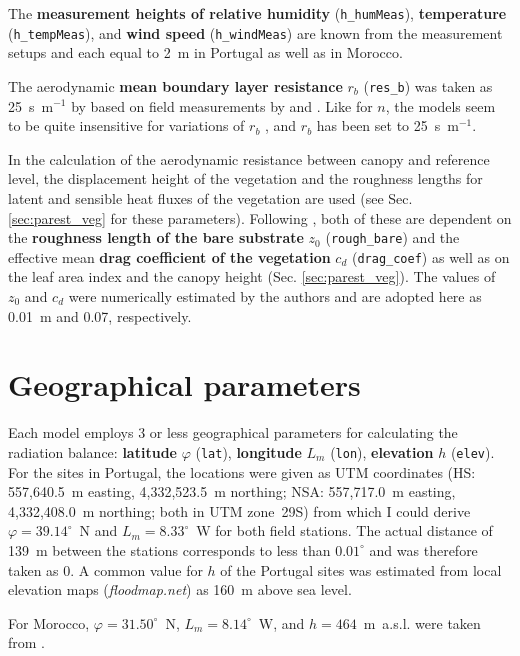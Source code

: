 \documentclass{scrreprt}
\begin{document}
The \textbf{measurement heights of relative humidity} (\verb!h_humMeas!), \textbf{temperature} (\verb!h_tempMeas!), and \textbf{wind speed} (\verb!h_windMeas!) are known from the measurement setups and each equal to 2~m in Portugal as well as in Morocco.

The aerodynamic \textbf{mean boundary layer resistance} $r_b$ (\verb!res_b!) was taken as 25~s~m$^{-1}$ by \citet{shuttleworth85} based on field measurements by \citet{denmead76} and \citet{uchijima76}.
Like for $n$, the models seem to be quite insensitive for variations of $r_b$ \citep{shuttleworth85}, and $r_b$ has been set to 25~s~m$^{-1}$.

In the calculation of the aerodynamic resistance between canopy and reference level, the displacement height of the vegetation and the roughness lengths for latent and sensible heat fluxes of the vegetation are used (see Sec. \ref{sec:parest_veg} for these parameters).
Following \citet{shuttleworth90}, both of these are dependent on the \textbf{roughness length of the bare substrate} $z_0$ (\verb!rough_bare!) and the effective mean \textbf{drag coefficient of the vegetation} $c_d$ (\verb!drag_coef!) as well as on the leaf area index and the canopy height (Sec. \ref{sec:parest_veg}).
The values of $z_0$ and $c_d$ were numerically estimated by the authors and are adopted here as 0.01~m and 0.07, respectively.

\section{Geographical parameters} \label{sec:parest_geo}

Each model employs 3 or less geographical parameters for calculating the radiation balance: \textbf{latitude} $\varphi$ (\verb!lat!), \textbf{longitude} $L_m$ (\verb!lon!), \textbf{elevation} $h$ (\verb!elev!).
For the sites in Portugal, the locations were given as UTM coordinates (HS: 557,640.5~m easting, 4,332,523.5~m northing; NSA: 557,717.0~m easting, 4,332,408.0~m northing; both in UTM zone~29S) from which I could derive $\varphi = 39.14^\circ$~N and $L_m= 8.33^\circ$~W for both field stations.
The actual distance of 139~m between the stations corresponds to less than $0.01^\circ$ and was therefore taken as 0.
A common value for $h$ of the Portugal sites was estimated from local elevation maps (\emph{floodmap.net}) as 160~m above sea level.

For Morocco, $\varphi = 31.50^\circ$~N, $L_m = 8.14^\circ$~W, and $h = 464$~m~a.s.l. were taken from \citet{mroos14}.
\end{document}
